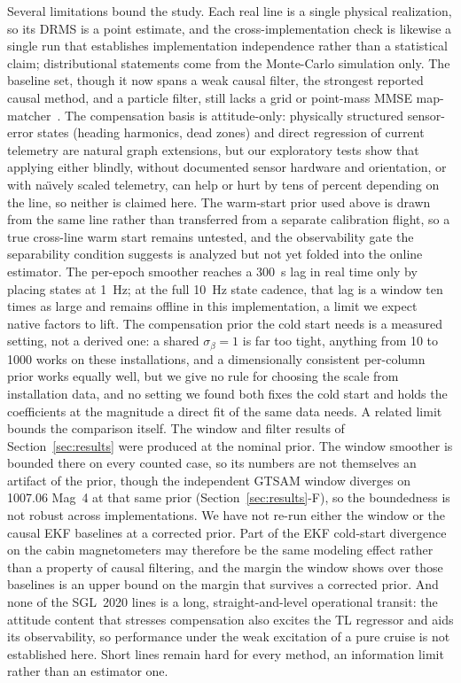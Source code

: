\documentclass{IEEEtaes}
\begin{document}
Several limitations bound the study. Each real line is a single physical
realization, so its DRMS is a point estimate, and the cross-implementation check is
likewise a single run that establishes implementation independence rather than a
statistical claim; distributional statements come from the Monte-Carlo simulation
only. The baseline set, though it now spans a weak causal filter, the strongest
reported causal method, and a particle filter, still lacks a grid or point-mass MMSE
map-matcher~\cite{bergman1999,nordlund2009}. The compensation basis is
attitude-only: physically structured sensor-error states (heading harmonics, dead
zones) and direct regression of current telemetry are natural graph extensions, but
our exploratory tests show that applying either blindly, without documented sensor
hardware and orientation, or with na\"{\i}vely scaled telemetry, can help or hurt by
tens of percent depending on the line, so neither is claimed here. The warm-start
prior used above is drawn from the same line rather than transferred from a separate
calibration flight, so a true cross-line warm start remains untested, and the
observability gate the separability condition suggests is analyzed but not yet
folded into the online estimator. The per-epoch smoother reaches a
\SI{300}{\second} lag in real time only by placing states at \SI{1}{\hertz}; at the
full \SI{10}{\hertz} state cadence, that lag is a window ten times as large and
remains offline in this implementation, a limit we expect native factors to lift.
The compensation prior the cold start needs is a measured setting, not a derived
one: a shared $\sigma_{\beta}=1$ is far too tight, anything from \num{10} to
\num{1000} works on these installations, and a dimensionally consistent
per-column prior works equally well, but we give no rule for choosing the scale
from installation data, and no setting we found both fixes the cold start and
holds the coefficients at the magnitude a direct fit of the same data needs. A related limit bounds the comparison itself. The window and
filter results of Section~\ref{sec:results} were produced at the nominal prior. The window smoother is bounded there on every
counted case, so its numbers are not themselves an artifact of the prior, though
the independent GTSAM window diverges on 1007.06 Mag~4 at that same prior
(Section~\ref{sec:results}-F), so the boundedness is not robust across
implementations. We have not re-run either the window or the causal EKF baselines
at a corrected prior. Part of the EKF cold-start divergence on the cabin magnetometers may
therefore be the same modeling effect rather than a property of causal filtering,
and the margin the window shows over those baselines is an upper bound on the
margin that survives a corrected prior. And none of
the SGL~2020 lines is a long, straight-and-level operational transit: the attitude
content that stresses compensation also excites the TL regressor and aids its
observability, so performance under the weak excitation of a pure cruise is not
established here. Short lines remain hard for every method, an information limit
rather than an estimator one.
\end{document}
